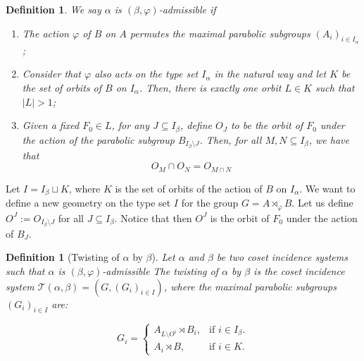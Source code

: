 \documentclass[11pt,letterpaper]{amsart}
\newtheorem{definition}[prop]{Definition}
\newcommand{\TT}{\mathcal{T}}
\begin{document}
\begin{definition}\label{def:GammaPhiAdmiss}
    We say $\alpha$ is $(\beta, \varphi)$-admissible %
    if
    \begin{enumerate}
        \item The action $\varphi$ of $B$ on $A$ permutes the maximal parabolic subgroups $(A_i)_{i\in I_\alpha}$;
        \item Consider that $\varphi$ also acts on the type set $I_\alpha$ in the natural way and let $K$ be the set of orbits of $B$ on $I_\alpha$. Then, there is exactly one orbit $L\in K$ such that $|L|>1$;
        \item Given a fixed $F_0\in L$, for any $J \subseteq I_\beta$, define $O_J$ to be the orbit of $F_0$ under the action of the parabolic subgroup $B_{I_\beta\setminus J}$. Then, for all $M,N\subseteq I_\beta$, we have that
        \begin{equation}\tag{IPO}\label{eq:IPO}
          O_M\cap O_N = O_{M\cap N} 
        \end{equation}
        
    \end{enumerate}
\end{definition}

Let $I = I_\beta \sqcup K$, where $K$ is the set of orbits of the action of $B$ on $I_\alpha$. We want to define a new geometry on the type set $I$ for the group $G = A \rtimes_\varphi B$. Let us define $O^J := O_{I_\beta \setminus J}$ for all $J \subseteq I_\beta$. Notice that then $O^J$ is the orbit of $F_0$ under the action of $B_J$.

\begin{definition}[Twisting of $\alpha$ by $\beta$]
    Let $\alpha$ and $\beta$ be two coset incidence systems such that $\alpha$ is $(\beta,\varphi)$-admissible
    The twisting of $\alpha$ by $\beta$ is the coset incidence system $\TT(\alpha,\beta) = (G,(G_i)_{i \in I})$, where
    the maximal parabolic subgroups $(G_i)_{i \in I}$ are:

\begin{equation}
 G_i= \begin{cases}
     A_{L \setminus O^i} \rtimes B_i, & \text{if $i \in I_\beta$}.\\
     A_i \rtimes B, & \text{if $i \in K$}.
  \end{cases}
\end{equation}
\end{definition}
\end{document}
